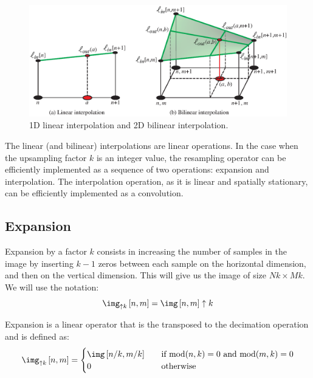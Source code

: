 \begin{figure}[h!]
	\centerline{
		\includegraphics[width=1\linewidth]{figures/upsamplig_downsampling/bilinear_interp2.eps}
	}
	\caption{1D linear interpolation and 2D bilinear interpolation.}
	\label{fig:bilinear_interp}
\end{figure}

The linear (and bilinear) interpolations are linear operations. In the case when the upsampling factor $k$ is an integer value, the resampling operator can be efficiently implemented as a sequence of two operations: expansion and interpolation. The interpolation operation, as it is linear and spatially stationary, can be efficiently implemented as a convolution.


\subsection{Expansion}

Expansion by a factor $k$ consists in increasing the number of samples in the image by inserting $k-1$ zeros between each sample on the horizontal dimension, and then on the vertical dimension. This will give us the image of size $Nk \times Mk$. We will use the notation:
\begin{equation}
	\img_{\uparrow k} \left[n,m\right]  = \img\left[n,m\right] \uparrow k
\end{equation}

Expansion is a linear operator that is the transposed to the decimation operation and is defined as:
\begin{equation}
	\img_{\uparrow k} \left[n,m\right] =
	\begin{cases}
		\img \left[n/k,m/k\right] & \quad \text{if~} \text{mod} (n,k)=0 \text{~and~} \text{mod} (m,k)=0 \\
		0                         & \quad \text{otherwise }                                             \\
	\end{cases}
	\label{eq:upzeros}
\end{equation}

